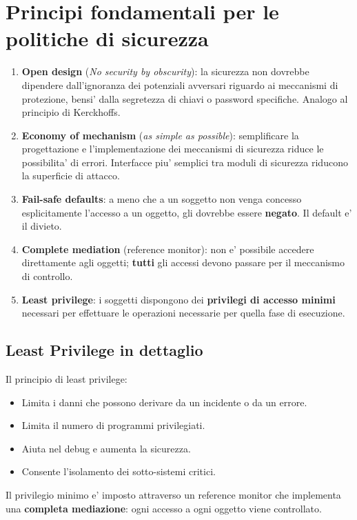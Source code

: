 \section{Principi fondamentali per le politiche di sicurezza}
\begin{enumerate}
  \item \textbf{Open design} (\textit{No security by obscurity}): la sicurezza non dovrebbe dipendere dall'ignoranza dei potenziali avversari riguardo ai meccanismi di protezione, bensi' dalla segretezza di chiavi o password specifiche. Analogo al principio di Kerckhoffs.
  \item \textbf{Economy of mechanism} (\textit{as simple as possible}): semplificare la progettazione e l'implementazione dei meccanismi di sicurezza riduce le possibilita' di errori. Interfacce piu' semplici tra moduli di sicurezza riducono la superficie di attacco.
  \item \textbf{Fail-safe defaults}: a meno che a un soggetto non venga concesso esplicitamente l'accesso a un oggetto, gli dovrebbe essere \textbf{negato}. Il default e' il divieto.
  \item \textbf{Complete mediation} (reference monitor): non e' possibile accedere direttamente agli oggetti; \textbf{tutti} gli accessi devono passare per il meccanismo di controllo.
  \item \textbf{Least privilege}: i soggetti dispongono dei \textbf{privilegi di accesso minimi} necessari per effettuare le operazioni necessarie per quella fase di esecuzione.
\end{enumerate}

\subsection{Least Privilege in dettaglio}
Il principio di least privilege:
\begin{itemize}
  \item Limita i danni che possono derivare da un incidente o da un errore.
  \item Limita il numero di programmi privilegiati.
  \item Aiuta nel debug e aumenta la sicurezza.
  \item Consente l'isolamento dei sotto-sistemi critici.
\end{itemize}
Il privilegio minimo e' imposto attraverso un reference monitor che implementa una \textbf{completa mediazione}: ogni accesso a ogni oggetto viene controllato.

